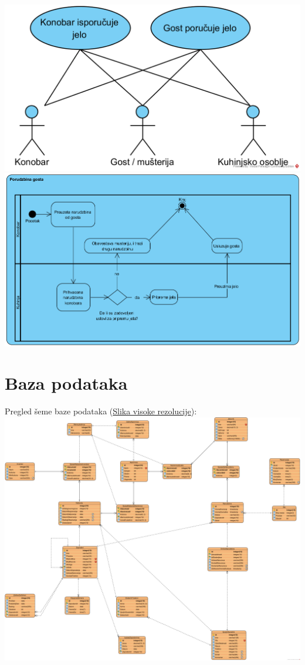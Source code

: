 \documentclass{article}
\begin{document}
  \includegraphics[width=\textwidth]{SU_7_konobar_kuhinja.png}
  \includegraphics[width=\textwidth]{SU_7_porudzbina.png}



\section{Baza podataka}
Pregled šeme baze podataka (\href{https://raw.githubusercontent.com/bozidarrr/NajmanjiProblem/master/FinalniDokument/NajmanjiProblem_BazaPodataka.png}{Slika visoke rezolucije}):\\
\vspace{1mm}
 \includegraphics[width=\textwidth]{NajmanjiProblem_BazaPodataka.png}
 
\end{document}
